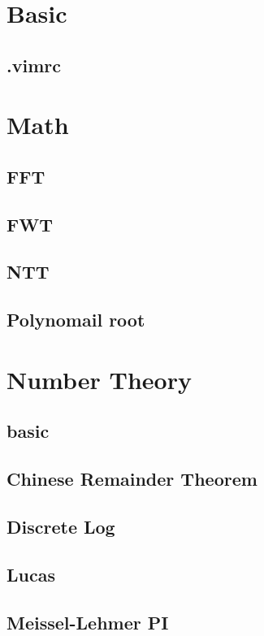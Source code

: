 \section{Basic}
\subsection{.vimrc}


\section{Math}
\subsection{FFT}

\subsection{FWT}

\subsection{NTT}

\subsection{Polynomail root}


\section{Number Theory}
\subsection{basic}

\subsection{Chinese Remainder Theorem}

\subsection{Discrete Log}

\subsection{Lucas}

\subsection{Meissel-Lehmer PI}

